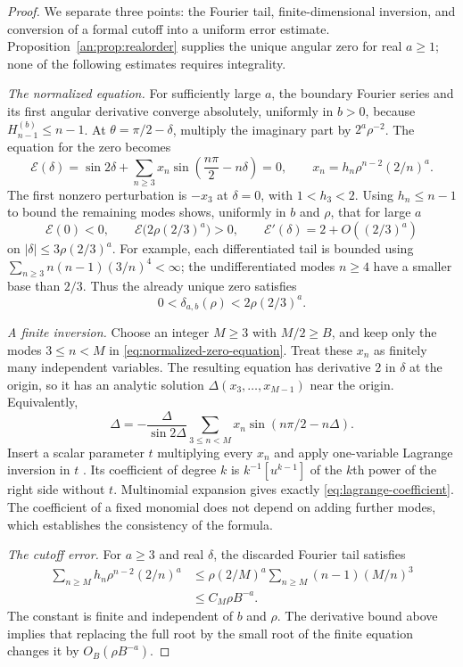 \documentclass[11pt]{article}
\numberwithin{equation}{section}
\theoremstyle{plain}
\theoremstyle{definition}
\theoremstyle{remark}
\begin{document}
\begin{proof}
We separate three points: the Fourier tail, finite-dimensional inversion,
and conversion of a formal cutoff into a uniform error estimate.
Proposition~\ref{an:prop:realorder} supplies the unique angular zero
for real $a\ge1$; none of the following estimates requires integrality.

\emph{The normalized equation.}
For sufficiently large $a$, the boundary Fourier series and its first
angular derivative converge absolutely, uniformly in $b>0$, because
$H_{n-1}^{(b)}\le n-1$. At
$\theta=\pi/2-\delta$, multiply the imaginary part by $2^a\rho^{-2}$.
The equation for the zero becomes
\begin{equation}\label{eq:normalized-zero-equation}
 \mathcal E(\delta)=\sin2\delta+
 \sum_{n\ge3}x_n\sin\left(\frac{n\pi}2-n\delta\right)=0,
 \qquad x_n=h_n\rho^{n-2}(2/n)^a.
\end{equation}
The first nonzero perturbation is $-x_3$ at $\delta=0$, with
$1<h_3<2$. Using $h_n\le n-1$ to bound the remaining modes shows,
uniformly in $b$ and $\rho$, that for large $a$
\[
 \mathcal E(0)<0,\qquad
 \mathcal E\bigl(2\rho(2/3)^a\bigr)>0,
 \qquad \mathcal E'(\delta)=2+O((2/3)^a)
\]
on $|\delta|\le3\rho(2/3)^a$. For example, each differentiated tail
is bounded using $\sum_{n\ge3}n(n-1)(3/n)^4<\infty$; the
undifferentiated modes $n\ge4$ have a smaller base than $2/3$.
Thus the already unique zero satisfies
\begin{equation}\label{eq:uniform-first-bound}
 0<\delta_{a,b}(\rho)<2\rho(2/3)^a.
\end{equation}

\emph{A finite inversion.}
Choose an integer $M\ge3$ with $M/2\ge B$, and keep only the modes
$3\le n<M$ in \eqref{eq:normalized-zero-equation}. Treat these
$x_n$ as finitely many independent variables. The resulting equation
has derivative $2$ in $\delta$ at the origin, so it has an analytic
solution $\Delta(x_3,\ldots,x_{M-1})$ near the origin. Equivalently,
\[
 \Delta=-\frac{\Delta}{\sin2\Delta}
       \sum_{3\le n<M}x_n\sin(n\pi/2-n\Delta).
\]
Insert a scalar parameter $t$ multiplying every $x_n$ and apply
one-variable Lagrange inversion in $t$ \cite{Gessel}. Its coefficient
of degree $k$ is $k^{-1}[u^{k-1}]$ of the $k$th power of the right
side without $t$. Multinomial expansion gives exactly
\eqref{eq:lagrange-coefficient}. The coefficient of a fixed monomial
does not depend on adding further modes, which establishes the
consistency of the formula.

\emph{The cutoff error.}
For $a\ge3$ and real $\delta$, the discarded Fourier tail satisfies
\begin{align*}
 \sum_{n\ge M}h_n\rho^{n-2}(2/n)^a
 &\le \rho(2/M)^a
       \sum_{n\ge M}(n-1)(M/n)^3\\
 &\le C_M\rho B^{-a}.
\end{align*}
The constant is finite and independent of $b$ and $\rho$.
The derivative bound above implies that replacing the full root by
the small root of the finite equation changes it by
$O_B(\rho B^{-a})$.


\end{proof}
\end{document}

